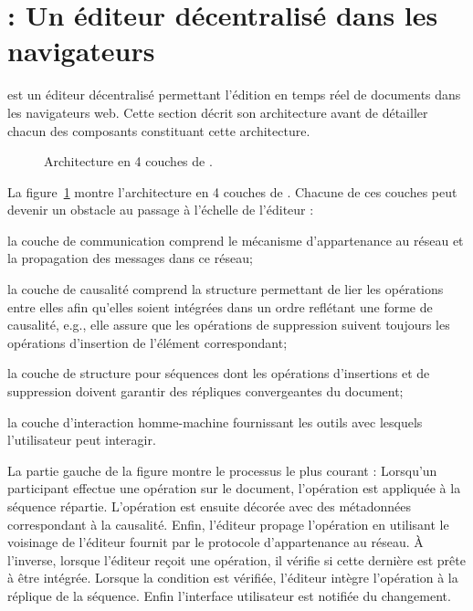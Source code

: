
\section{\CRATE : Un éditeur décentralisé dans les navigateurs}
\label{editor:sec:crate}

\CRATE est un éditeur décentralisé permettant l'édition en temps réel de
documents dans les navigateurs web. Cette section décrit son architecture avant
de détailler chacun des composants constituant cette architecture.

\begin{figure}
  \begin{center}
    
    \caption[Architecture de \CRATE]
    {\label{editor:fig:architecture}Architecture en 4 couches de \CRATE.}
  \end{center}
\end{figure}

La figure~\ref{editor:fig:architecture} montre l'architecture en 4 couches de
\CRATE. Chacune de ces couches peut devenir un obstacle au passage à l'échelle
de l'éditeur :
\begin{inparaenum}[(i)]
\item la couche de communication comprend le mécanisme d'appartenance au réseau
  et la propagation des messages dans ce réseau;
\item la couche de causalité comprend la structure permettant de lier les
  opérations entre elles afin qu'elles soient intégrées dans un ordre reflétant
  une forme de causalité, e.g., elle assure que les opérations de suppression
  suivent toujours les opérations d'insertion de l'élément correspondant;
\item la couche de structure pour séquences dont les opérations d'insertions et
  de suppression doivent garantir des répliques convergeantes du document;
\item la couche d'interaction homme-machine fournissant les outils avec lesquels
  l'utilisateur peut interagir.
\end{inparaenum}

La partie gauche de la figure montre le processus le plus courant : Lorsqu'un
participant effectue une opération sur le document, l'opération est appliquée à
la séquence répartie. L'opération est ensuite décorée avec des métadonnées
correspondant à la causalité. Enfin, l'éditeur propage l'opération en utilisant
le voisinage de l'éditeur fournit par le protocole d'appartenance au réseau.  À
l'inverse, lorsque l'éditeur reçoit une opération, il vérifie si cette dernière
est prête à être intégrée. Lorsque la condition est vérifiée, l'éditeur intègre
l'opération à la réplique de la séquence. Enfin l'interface utilisateur est
notifiée du changement.

